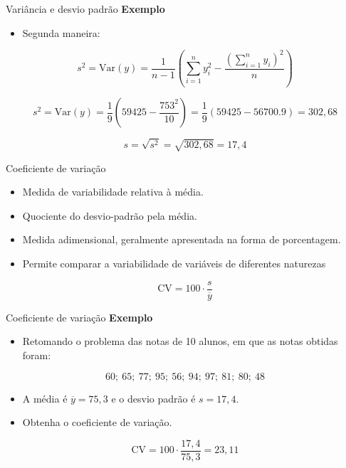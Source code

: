 \documentclass[
  ignorenonframetext,
  serif,
  professionalfont,
  usenames,
  dvipsnames,
  aspectratio = 169]{beamer}
\providecommand{\tightlist}{%
  \setlength{\itemsep}{0pt}\setlength{\parskip}{0pt}}
\renewcommand{\tightlist}{%
  \setlength{\itemsep}{0\baselineskip}
  \setlength{\parskip}{0.25\baselineskip}
}
\begin{document}
\begin{frame}{Variância e desvio padrão}
\protect\hypertarget{variuxe2ncia-e-desvio-padruxe3o-3}{}
\textbf{Exemplo}

\begin{itemize}
\tightlist
\item
  Segunda maneira:
\end{itemize}

\[
s^2 = \textrm{Var}(y) = \frac{1}{n - 1}\left(\sum_{i = 1}^{n} y_i^2 - \frac{(\sum_{i = 1}^{n} y_i)^2}{n}\right)
\]

\[
s^2 = \textrm{Var}(y) = \frac{1}{9}\left(59425
 - \frac{753^2}{10}\right) = \frac{1}{9}\left(59425
 - 56700.9\right) = 302,68
\]

\[ s = \sqrt{s^2} = \sqrt{302,68} = 17,4\]
\end{frame}

\begin{frame}{Coeficiente de variação}
\protect\hypertarget{coeficiente-de-variauxe7uxe3o}{}
\begin{itemize}
\tightlist
\item
  Medida de variabilidade relativa à média.
\item
  Quociente do desvio-padrão pela média.
\item
  Medida adimensional, geralmente apresentada na forma de porcentagem.
\item
  Permite comparar a variabilidade de variáveis de diferentes naturezas
\end{itemize}

\[
\textrm{CV} = 100 \cdot \frac{s}{\overline{y}}
\]
\end{frame}

\begin{frame}{Coeficiente de variação}
\protect\hypertarget{coeficiente-de-variauxe7uxe3o-1}{}
\textbf{Exemplo}

\begin{itemize}
\tightlist
\item
  Retomando o problema das notas de 10 alunos, em que as notas obtidas
  foram:
\end{itemize}

\[60;\ 65;\ 77;\ 95;\ 56;\ 94;\ 97;\ 81;\ 80;\ 48\]

\begin{itemize}
\item
  A média é \(\overline{y} = 75,3\) e o desvio padrão é \(s = 17,4\).
\item
  Obtenha o coeficiente de variação.
\end{itemize}

\[
\textrm{CV} = 100 \cdot \frac{17,4}{75,3} = 23,11
\]
\end{frame}
\end{document}
